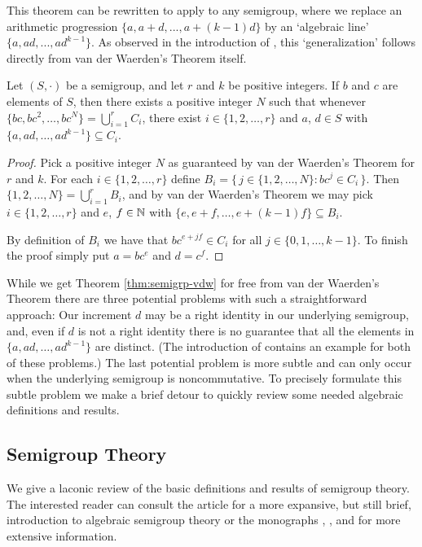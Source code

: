 This theorem can be rewritten to apply to any semigroup, where we replace an arithmetic progression $\{a, a+d, ..., a+(k-1)d\}$ by an `algebraic line' $\{a, ad, ..., ad^{k-1}\}$. As observed in the introduction of \cite{Bergelson:1992fk}, this `generalization' follows directly from van der Waerden's Theorem itself. 

\begin{thm}
  \label{thm:semigrp-vdw}
  Let $(S, \cdot)$ be a semigroup, and let $r$ and $k$ be positive integers.
  If $b$ and $c$ are elements of $S$, then there exists a positive integer $N$ such that whenever $\{bc, bc^2, \ldots, bc^N\} = \bigcup_{i=1}^r C_i$, there exist $i \in \{1, 2, \ldots, r\}$ and $a$, $d \in S$ with $\{a, ad, \ldots, ad^{k-1}\} \subseteq C_i$.
\end{thm}
\begin{proof}
  Pick a positive integer $N$ as guaranteed by van der Waerden's Theorem for $r$ and $k$.
  For each $i \in \{1, 2, \ldots, r\}$ define $B_i = \bigl\{\, j \in \{1, 2, \ldots, N\} : bc^j \in C_i \,\bigr\}$.
  Then $\{1, 2, \ldots, N\} = \bigcup_{i=1}^r B_i$, and by van der Waerden's Theorem we may pick $i \in \{1, 2, \ldots, r\}$ and $e$, $f \in \mathbb{N}$ with $\{e, e+f, \ldots, e+(k-1)f\} \subseteq B_i$.
  
  By definition of $B_i$ we have that $bc^{e+jf} \in C_i$ for all $j \in \{0, 1, \ldots, k-1\}$.
  To finish the proof simply put $a = bc^e$ and $d = c^f$.
\end{proof}

While we get Theorem \ref{thm:semigrp-vdw} for free from van der Waerden's Theorem there are three potential problems with such a straightforward approach:
Our increment $d$ may be a right identity in our underlying semigroup, and, even if $d$ is not a right identity there is no guarantee that all the elements in $\{a, ad, \ldots, ad^{k-1}\}$ are distinct.
(The introduction of \cite{Bergelson:1992fk} contains an example for both of these problems.)
The last potential problem is more subtle and can only occur when the underlying semigroup is noncommutative.
To precisely formulate this subtle problem we make a brief detour to quickly review some needed algebraic definitions and results.

\subsection{Semigroup Theory}
We give a laconic review of the basic definitions and results of semigroup theory.
The interested reader can consult the article \cite{Hollings:2007uq} for a more expansive, but still brief, introduction to algebraic semigroup theory or the monographs \cite{Clifford:1961fk}, \cite{Clifford:1967fk}, and \cite[Chapter 1]{Hindman:1998fk} for more extensive information. 

